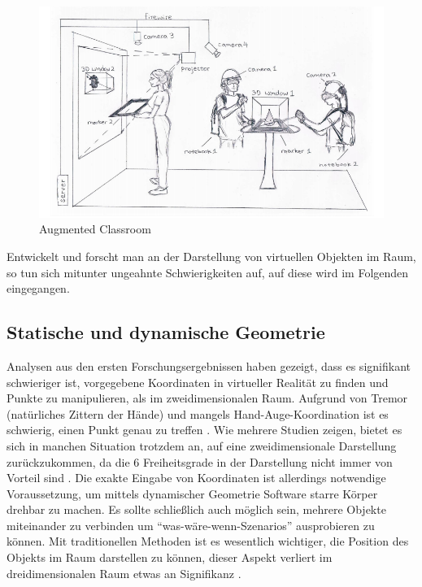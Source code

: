 \documentclass[deutsch]{llncs}
\begin{document}
\begin{figure}[h]
	\centering
	\includegraphics[width=1\textwidth]{figures/classroom}
	\caption{Augmented Classroom}
	\label{fig:samplefigure}
\end{figure}

Entwickelt und forscht man an der Darstellung von virtuellen Objekten im Raum, so tun sich mitunter ungeahnte Schwierigkeiten auf, auf diese wird im Folgenden eingegangen.
\subsection{Statische und dynamische Geometrie}
Analysen aus den ersten Forschungsergebnissen haben gezeigt, dass es signifikant schwieriger ist, vorgegebene Koordinaten in virtueller Realität zu finden und Punkte zu manipulieren, als im zweidimensionalen Raum. Aufgrund von Tremor (natürliches Zittern der Hände) und mangels Hand-Auge-Koordination ist es schwierig, einen Punkt genau zu treffen \cite{1667626}. 
Wie mehrere Studien zeigen, bietet es sich in manchen Situation trotzdem an, auf eine zweidimensionale Darstellung zurückzukommen, da die 6 Freiheitsgrade in der Darstellung nicht immer von Vorteil sind \cite{Bowman:1999:ITC:930593}. 
Die exakte Eingabe von Koordinaten ist allerdings notwendige Voraussetzung, um mittels dynamischer Geometrie Software starre Körper drehbar zu machen. Es sollte schließlich auch möglich sein, mehrere Objekte miteinander zu verbinden um ``was-wäre-wenn-Szenarios'' ausprobieren zu können. Mit traditionellen Methoden ist es wesentlich wichtiger, die Position des Objekts im Raum darstellen zu können, dieser Aspekt verliert im dreidimensionalen Raum etwas an Signifikanz \cite{1667626}. 
\end{document}
